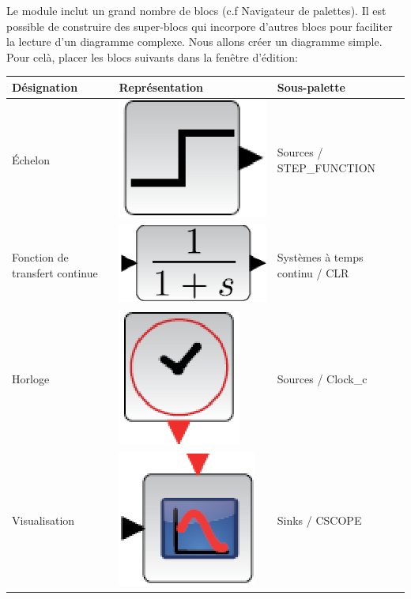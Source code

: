 Le module inclut un grand nombre de blocs (c.f Navigateur de palettes).
Il est possible de construire des super-blocs qui incorpore d'autres blocs pour
faciliter la lecture d'un diagramme complexe. \newline
Nous allons créer un diagramme simple. Pour celà, placer les blocs suivants 
dans la fenêtre d'édition:
\begin{table}[!h]
    \centering
    \begin{tabular}{@{}P{4cm}P{6cm}P{4cm}@{}}
    \toprule
    Désignation   & Représentation & Sous-palette \\
    \midrule
    \'Echelon     & 
    \begin{minipage}{6cm}
    \centering
    \includegraphics[width=0.25\linewidth]{fig/scilab05.eps}
    \end{minipage} &
    Sources / STEP\_FUNCTION \\
    \midrule
    Fonction de transfert continue     & 
    \begin{minipage}{6cm}
    \centering
    \includegraphics[width=0.25\linewidth]{fig/scilab06.eps}
    \end{minipage} & 
    Systèmes à temps continu / CLR \\
    \midrule
    Horloge       & 
    \begin{minipage}{6cm}
    \centering
    \includegraphics[width=0.2\linewidth]{fig/scilab07.eps}
    \end{minipage} & 
    Sources / Clock\_c \\
    \midrule
    Visualisation & 
    \begin{minipage}{6cm}
    \centering
    \includegraphics[width=0.25\linewidth]{fig/scilab08.eps}
    \end{minipage} & 
    Sinks / CSCOPE \\
    \bottomrule
\end{tabular}
\end{table}
